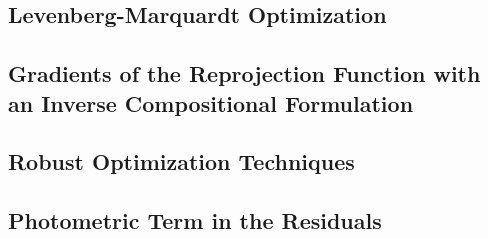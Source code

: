 \subsection{Levenberg-Marquardt Optimization}%
\label{sub:lm-optimization}

\subsection{Gradients of the Reprojection Function with an Inverse Compositional Formulation}%
\label{sub:gradients-inverse-compostional}

\subsection{Robust Optimization Techniques}%
\label{sub:robust-optim}

\subsection{Photometric Term in the Residuals}%
\label{sub:photometric-residual}

